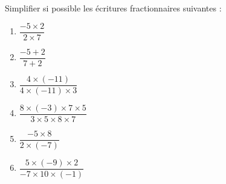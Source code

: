 
\begin{exercice}\label{exo2smath-0026}

Simplifier si possible les écritures fractionnaires suivantes :
\begin{multicols}{2}
    \begin{enumerate}
        \item
            \( \dfrac{ -5\times 2 }{ 2\times 7 }\)
        \item
            \( \dfrac{ -5+2 }{ 7+2 }\)
        \item
            \( \dfrac{ 4\times (-11) }{ 4\times (-11)\times 3 }\)
        \item
            \( \dfrac{ 8\times (-3)\times 7\times 5 }{ 3\times 5\times 8\times 7 }\)
        \item
            \( \dfrac{ -5\times 8 }{ 2\times (-7) }\)
        \item
            \( \dfrac{ 5\times (-9)\times 2 }{ -7\times 10\times (-1) }\)
    \end{enumerate}
\end{multicols}

\end{exercice}
